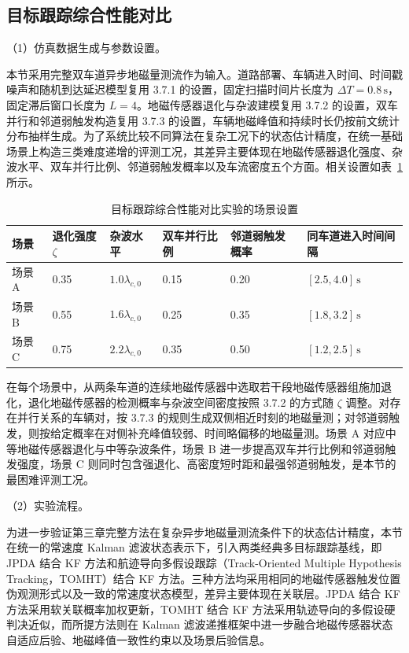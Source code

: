 \documentclass{xdupgthesis}
\begin{document}
\subsection{目标跟踪综合性能对比}

\noindent （1）仿真数据生成与参数设置。

本节采用完整双车道异步地磁量测流作为输入。道路部署、车辆进入时间、时间戳噪声和随机到达延迟模型复用 3.7.1 的设置，固定扫描时间片长度为 $\Delta T=0.8\,\mathrm{s}$，固定滞后窗口长度为 $L=4$。地磁传感器退化与杂波建模复用 3.7.2 的设置，双车并行和邻道弱触发构造复用 3.7.3 的设置，车辆地磁峰值和持续时长仍按前文统计分布抽样生成。为了系统比较不同算法在复杂工况下的状态估计精度，在统一基础场景上构造三类难度递增的评测工况，其差异主要体现在地磁传感器退化强度、杂波水平、双车并行比例、邻道弱触发概率以及车流密度五个方面。相关设置如表~\ref{tab:ch3_tracking_scene_setup} 所示。

\begin{table}[H]
	\centering
	\caption{目标跟踪综合性能对比实验的场景设置}
	\label{tab:ch3_tracking_scene_setup}
	\small
	\begin{tabular}{p{1.8cm}p{2.2cm}p{2.0cm}p{2.0cm}p{2.2cm}p{2.3cm}}
		\toprule
		场景 & 退化强度 $\zeta$ & 杂波水平 & 双车并行比例 & 邻道弱触发概率 & 同车道进入时间间隔 \\
		\midrule
		场景 A & 0.35 & $1.0\lambda_{c,0}$ & 0.15 & 0.20 & $[2.5,4.0]\,\mathrm{s}$ \\
		场景 B & 0.55 & $1.6\lambda_{c,0}$ & 0.25 & 0.35 & $[1.8,3.2]\,\mathrm{s}$ \\
		场景 C & 0.75 & $2.2\lambda_{c,0}$ & 0.35 & 0.50 & $[1.2,2.5]\,\mathrm{s}$ \\
		\bottomrule
	\end{tabular}
\end{table}

在每个场景中，从两条车道的连续地磁传感器中选取若干段地磁传感器组施加退化，退化地磁传感器的检测概率与杂波空间密度按照 3.7.2 的方式随 $\zeta$ 调整。对存在并行关系的车辆对，按 3.7.3 的规则生成双侧相近时刻的地磁量测；对邻道弱触发，则按给定概率在对侧补充峰值较弱、时间略偏移的地磁量测。场景 A 对应中等地磁传感器退化与中等杂波条件，场景 B 进一步提高双车并行比例和邻道弱触发强度，场景 C 则同时包含强退化、高密度短时距和最强邻道弱触发，是本节的最困难评测工况。

\noindent （2）实验流程。

为进一步验证第三章完整方法在复杂异步地磁量测流条件下的状态估计精度，本节在统一的常速度 Kalman 滤波状态表示下，引入两类经典多目标跟踪基线，即 JPDA 结合 KF 方法和航迹导向多假设跟踪（Track-Oriented Multiple Hypothesis Tracking，TOMHT）结合 KF 方法。三种方法均采用相同的地磁传感器触发位置伪观测形式以及一致的常速度状态模型，差异主要体现在关联层。JPDA 结合 KF 方法采用软关联概率加权更新，TOMHT 结合 KF 方法采用轨迹导向的多假设硬判决近似，而所提方法则在 Kalman 滤波递推框架中进一步融合地磁传感器状态自适应后验、地磁峰值一致性约束以及场景后验信息。
\end{document}
